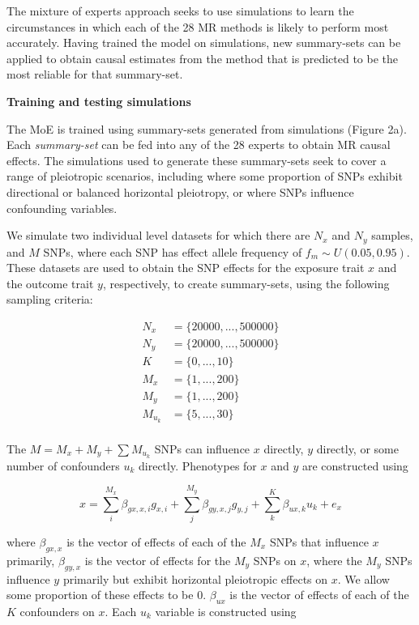 \documentclass[]{article}
\begin{document}
The mixture of experts approach seeks to use simulations to learn the
circumstances in which each of the 28 MR methods is likely to perform
most accurately. Having trained the model on simulations, new
summary-sets can be applied to obtain causal estimates from the method
that is predicted to be the most reliable for that summary-set.

\textbf{Training and testing simulations}

The MoE is trained using summary-sets generated from simulations (Figure
2a). Each \emph{summary-set} can be fed into any of the 28 experts to
obtain MR causal effects. The simulations used to generate these
summary-sets seek to cover a range of pleiotropic scenarios, including
where some proportion of SNPs exhibit directional or balanced horizontal
pleiotropy, or where SNPs influence confounding variables.

We simulate two individual level datasets for which there are \(N_x\)
and \(N_y\) samples, and \(M\) SNPs, where each SNP has effect allele
frequency of \(f_m \sim U(0.05, 0.95)\). These datasets are used to
obtain the SNP effects for the exposure trait \(x\) and the outcome
trait \(y\), respectively, to create summary-sets, using the following
sampling criteria:

\[
\begin{aligned}
N_x & = \{20000, ..., 500000\} \\
N_y & = \{20000, ..., 500000\} \\
K & = \{0, ..., 10\} \\
M_x & = \{1, ..., 200\} \\
M_y & = \{1, ..., 200\} \\
M_{u_k} & = \{5,..., 30\} \\
\end{aligned}
\]

The \(M = M_x + M_y + \sum{M_{u_k}}\) SNPs can influence \(x\) directly,
\(y\) directly, or some number of confounders \(u_{k}\) directly.
Phenotypes for \(x\) and \(y\) are constructed using

\[
x = \sum^{M_x}_{i}{\beta_{gx,x,i}g_{x,i}} + \sum^{M_y}_{j}{\beta_{gy,x,j}g_{y,j}} + \sum^{K}_{k}{\beta_{ux,k} u_{k}} + e_{x}
\]

where \(\beta_{gx,x}\) is the vector of effects of each of the \(M_x\)
SNPs that influence \(x\) primarily, \(\beta_{gy,x}\) is the vector of
effects for the \(M_y\) SNPs on \(x\), where the \(M_y\) SNPs influence
\(y\) primarily but exhibit horizontal pleiotropic effects on \(x\). We
allow some proportion of these effects to be 0. \(\beta_{ux}\) is the
vector of effects of each of the \(K\) confounders on \(x\). Each
\(u_{k}\) variable is constructed using
\end{document}
